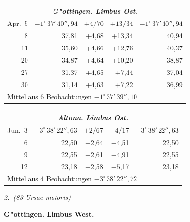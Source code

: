 \documentclass[12pt,a4paper]{article}
\theoremstyle{plain}
\theoremstyle{definition}
\theoremstyle{remark}
\begin{document}
\begin{small}
\begin{tabular}{@{}r|r|r|r|r@{}}
\multicolumn{5}{c}{\textit{G"ottingen. Limbus Ost.}}\\
\hline
\rule{0pt}{1em}Apr.~5 & $-1^\circ\,37'\,40''{,}94$ & $+4/70$ & $+13/34$ & $-1^\circ\,37'\,40''{,}94$ \\
\phantom{0}8 & 37,81 & +4,68 & +13,34 & 40,94 \\
11 & 35,60 & +4,66 & +12,76 & 40,37 \\
20 & 34,87 & +4,64 & +10,20 & 38,87 \\
27 & 31,37 & +4,65 & +\phantom{0}7,44 & 37,04 \\
30 & 31,14 & +4,63 & +\phantom{0}7,22 & 36,99 \\
\hline
\multicolumn{5}{l}{Mittel aus 6 Beobachtungen $-1^\circ\,37'\,39''{,}10$}
\end{tabular}
\hfill
\begin{tabular}{@{}r|r|r|r|r@{}}
\multicolumn{5}{c}{\textit{Altona. Limbus Ost.}}\\
\hline
\rule{0pt}{1em}Jun.~3 & $-3^\circ\,38'\,22''{,}63$ & $+2/67$ & $-4/17$ & $-3^\circ\,38'\,22''{,}63$ \\
\phantom{0}6 & 22,50 & +2,64 & $-4$,51 & 22,50 \\
\phantom{0}9 & 22,55 & +2,61 & $-4$,91 & 22,55 \\
12 & 23,18 & +2,58 & $-5$,17 & 23,18 \\
\hline
\multicolumn{5}{l}{Mittel aus 4 Beobachtungen $-3^\circ\,38'\,22''{,}72$}
\end{tabular}
\end{small}

\vspace{0.8cm}
\begin{center}
\textit{2.~(83 Ursae maioris)}
\end{center}

\vspace{0.2cm}
\noindent
\textbf{G"ottingen.}
\hspace{2cm}
\textbf{Limbus West.}
\end{document}
